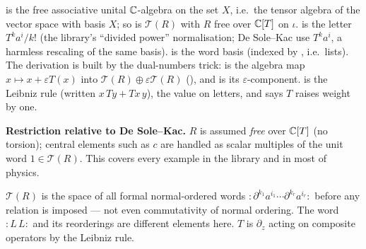 \begin{dictionary}
 is the free associative unital ${\mathbb{C}}$-algebra on the set $X$, i.e.\ the tensor algebra of the vector
space with basis $X$; so  is $\mathcal T(R)$ with $R$ free over ${\mathbb{C}}[T]$ on $\iota$.  is the
letter $T^ka^i/k!$ (the library's ``divided power'' normalisation; De Sole--Kac use $T^ka^i$, a harmless rescaling of the
same basis).  is the word basis (indexed by , i.e.\ lists). The derivation is built by the
dual-numbers trick:  is the algebra map $x\mapsto x+\varepsilon T(x)$ into $\mathcal T(R)\oplus\varepsilon\mathcal T(R)$
(), and  is its $\varepsilon$-component.  is the Leibniz rule (written
$x\,Ty + Tx\,y$),  the value on letters, and  says $T$ raises weight by one.

\textbf{Restriction relative to De Sole--Kac.} $R$ is assumed \emph{free} over ${\mathbb{C}}[T]$ (no torsion); central elements
such as $c$ are handled as scalar multiples of the unit word $1\in\mathcal T(R)$. This covers every example in the
library and in most of physics.
\end{dictionary}

\begin{physics}
$\mathcal T(R)$ is the space of all formal normal-ordered words ${:}\partial^{k_1}a^{i_1}\cdots\partial^{k_r}a^{i_r}{:}$
before any relation is imposed --- not even commutativity of normal ordering. The word ${:}L\,L{:}$ and its reorderings are
different elements here. $T$ is $\partial_z$ acting on composite operators by the Leibniz rule.
\end{physics}

